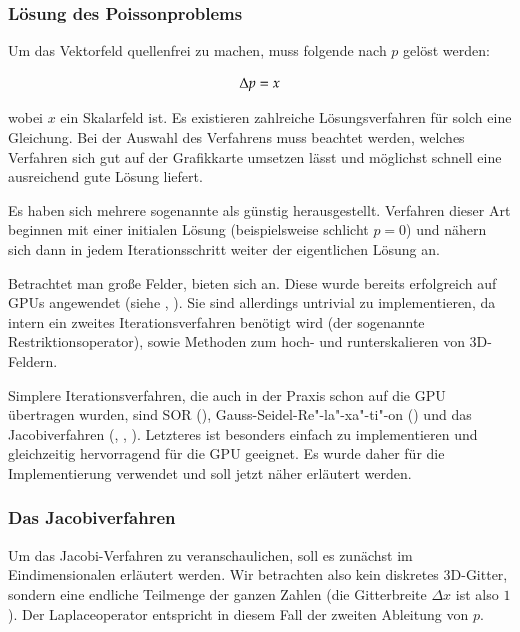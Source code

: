 \subsubsection{Lösung des Poissonproblems}

Um das Vektorfeld quellenfrei zu machen, muss folgende
 nach $p$ gelöst werden:

\begin{equation}
\Delta{p} = x
\end{equation}

wobei $x$ ein Skalarfeld ist. Es existieren zahlreiche Lösungsverfahren für solch
eine Gleichung. Bei der Auswahl des Verfahrens muss beachtet werden, welches
Verfahren sich gut auf der Grafikkarte umsetzen lässt und möglichst schnell eine
ausreichend gute Lösung liefert.

Es haben sich mehrere sogenannte  als
günstig herausgestellt. Verfahren dieser Art beginnen mit einer initialen Lösung
(beispielsweise schlicht $p=0$) und nähern sich dann in jedem Iterationsschritt
weiter der eigentlichen Lösung an.

Betrachtet man große Felder, bieten sich 
an. Diese wurde bereits erfolgreich auf GPUs angewendet (siehe \cite{Bolz2002},
\cite{Matthias2006}). Sie sind allerdings untrivial zu implementieren, da intern
ein zweites Iterationsverfahren benötigt wird (der sogenannte
Restriktionsoperator), sowie Methoden zum hoch- und runterskalieren von
3D-Feldern.

Simplere Iterationsverfahren, die auch in der Praxis schon auf die GPU
übertragen wurden, sind SOR (\cite{Saltvik2006}),
Gauss-Seidel-Re"-la"-xa"-ti"-on (\cite{Stam2003}) und das
Jacobiverfahren (\cite{Crane2007}, \cite{Harris2008},
\cite{Peschel2009}). Letzteres ist besonders einfach zu implementieren
und gleichzeitig hervorragend für die GPU geeignet. Es wurde daher für
die Implementierung verwendet und soll jetzt näher erläutert werden.

\subsubsection{Das Jacobiverfahren}

Um das Jacobi-Verfahren zu veranschaulichen, soll es zunächst im
Eindimensionalen erläutert werden. Wir betrachten also kein diskretes 3D-Gitter,
sondern eine endliche Teilmenge der ganzen Zahlen (die Gitterbreite $\Delta x$
ist also $1$). Der Laplaceoperator entspricht in diesem Fall der zweiten
Ableitung von $p$.

